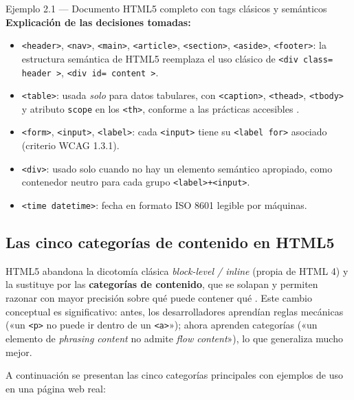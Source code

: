 \begin{cajaejemplo}{Ejemplo 2.1 --- Documento HTML5 completo con tags clásicos y semánticos}
\textbf{Explicación de las decisiones tomadas:}
\begin{itemize}
\item \texttt{<header>}, \texttt{<nav>}, \texttt{<main>},
\texttt{<article>}, \texttt{<section>}, \texttt{<aside>},
\texttt{<footer>}: la estructura semántica de HTML5 reemplaza el uso
clásico de \texttt{<div class= header >}, \texttt{<div id= content >}.
\item \texttt{<table>}: usada \emph{solo} para datos tabulares, con
\texttt{<caption>}, \texttt{<thead>}, \texttt{<tbody>} y atributo
\texttt{scope} en los \texttt{<th>}, conforme a las prácticas
accesibles \cite{robbins2018learning}.
\item \texttt{<form>}, \texttt{<input>}, \texttt{<label>}: cada
\texttt{<input>} tiene su \texttt{<label for>} asociado (criterio
WCAG 1.3.1).
\item \texttt{<div>}: usado solo cuando no hay un elemento semántico
apropiado, como contenedor neutro para cada grupo \texttt{<label>+<input>}.
\item \texttt{<time datetime>}: fecha en formato ISO 8601 legible
por máquinas.
\end{itemize}
\end{cajaejemplo}

\subsection{Las cinco categorías de contenido en HTML5}

HTML5 abandona la dicotomía clásica \emph{block-level / inline}
(propia de HTML 4) y la sustituye por las \textbf{categorías de
contenido}, que se solapan y permiten razonar con mayor precisión
sobre qué puede contener qué \cite{hickson2014html5}. Este cambio
conceptual es significativo: antes, los desarrolladores aprendían
reglas mecánicas («un \texttt{<p>} no puede ir dentro de un
\texttt{<a>}»); ahora aprenden categorías («un elemento de
\emph{phrasing content} no admite \emph{flow content}»), lo que
generaliza mucho mejor.

A continuación se presentan las cinco categorías principales con
ejemplos de uso en una página web real:

